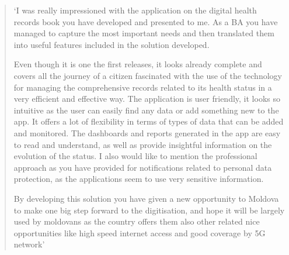 \begin{quotation}
`I was really impressioned with the application on the digital health records book you have developed and presented to me. As a BA you have managed to capture the most important needs and then translated them into useful features included in the solution developed.

Even though it is one the first releases, it looks already complete and covers all the journey of a citizen fascinated with the use of the technology for managing the comprehensive records related to its health status in a very efficient and effective way. The application is user friendly, it looks so intuitive as the user can easily find any data or add something new to the app. It offers a lot of flexibility in terms of types of data that can be added and monitored. The dashboards and reports generated in the app are easy to read and understand, as well as provide insightful information on the evolution of the status. I also would like to mention the professional approach as you have provided for notifications related to personal data protection, as the applications seem to use very sensitive information.

By developing this solution you have given a new opportunity to Moldova to make one big step forward to the digitisation, and hope it will be largely used by moldovans as the country offers them also other related nice opportunities like high speed internet access and good coverage by 5G network'
\end{quotation}